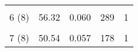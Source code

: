 \begin{table}[H]
{\begin{tabular}{|ccccc|}
\multicolumn{1}{|c|}{}                                                                                                                  & \multicolumn{1}{c|}{}                                                                                                                      & \multicolumn{1}{c|}{}                                                                                                                              & \multicolumn{1}{c|}{}                                                                                                                         &                                                      \\
\multicolumn{1}{|c|}{\multirow{-2}{*}{6 (8)}}                                                                                           & \multicolumn{1}{c|}{\multirow{-2}{*}{56.32}}                                                                                               & \multicolumn{1}{c|}{\multirow{-2}{*}{0.060}}                                                                                                       & \multicolumn{1}{c|}{\multirow{-2}{*}{289}}                                                                                                    & \multirow{-2}{*}{1}                                  \\ \hline
\multicolumn{1}{|c|}{}                                                                                                                  & \multicolumn{1}{c|}{}                                                                                                                      & \multicolumn{1}{c|}{}                                                                                                                              & \multicolumn{1}{c|}{}                                                                                                                         &                                                      \\
\multicolumn{1}{|c|}{\multirow{-2}{*}{7 (8)}}                                                                                           & \multicolumn{1}{c|}{\multirow{-2}{*}{50.54}}                                                                                               & \multicolumn{1}{c|}{\multirow{-2}{*}{0.057}}                                                                                                       & \multicolumn{1}{c|}{\multirow{-2}{*}{178}}                                                                                                    & \multirow{-2}{*}{1}                                  \\ \hline

\end{tabular}}
\end{table}
